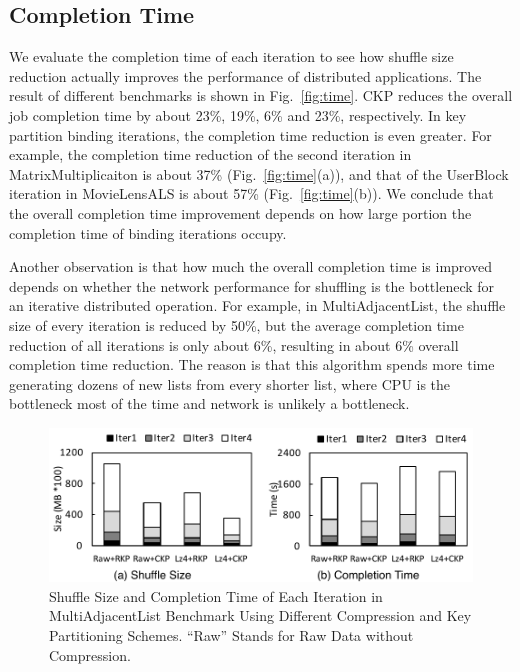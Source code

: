 \documentclass[10pt,journal,compsoc]{IEEEtran}
\begin{document}
\subsection{Completion Time}
We evaluate the completion time of each iteration to see how shuffle size 
reduction actually improves the performance of distributed applications. 
The result of different benchmarks is shown in Fig.~\ref{fig:time}. 
CKP reduces the overall job completion time by about 23\%, 19\%, 6\% and 23\%, 
respectively. 
In key partition binding iterations, the completion time reduction is even greater.  
For example, the completion time reduction of 
the second iteration in MatrixMultiplicaiton is about 37\% (Fig.~\ref{fig:time}(a)), 
and that of the UserBlock iteration in MovieLensALS is about 57\% (Fig.~\ref{fig:time}(b)). 
We conclude that the overall completion time improvement
depends on how large portion the completion time of binding iterations 
occupy. 

Another observation is that how much the overall completion time is improved 
depends on whether the network performance for shuffling is the bottleneck for 
an iterative distributed operation. For example, in MultiAdjacentList, the shuffle size of every iteration is reduced by 50\%, but the average completion time reduction of all iterations
is only about 6\%, resulting in about 6\% overall completion time reduction.
The reason is that this algorithm spends more time generating dozens of 
new lists from every shorter list, where CPU is the bottleneck most of the time
and network is unlikely a bottleneck. 

\begin{figure}[!t]
\centering
\includegraphics[width=1\columnwidth]{adjList_compress}
\caption{Shuffle Size and Completion Time of Each Iteration in MultiAdjacentList
Benchmark Using Different Compression and Key Partitioning Schemes. ``Raw'' Stands for Raw Data without Compression.}
\label{fig:compress}
\end{figure}
\end{document}
